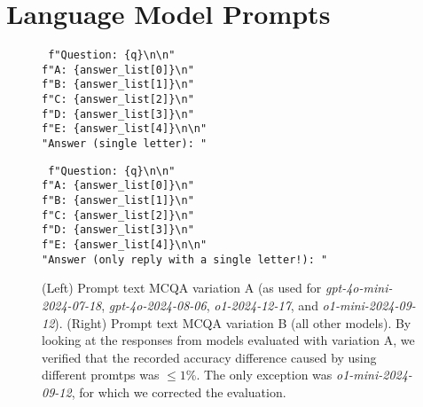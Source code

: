 \newpage

\section{Language Model Prompts}
\label{app:prompting}

\begin{figure}[ht]
    \centering
    \begin{minipage}[b]{0.38\textwidth}
        \begin{framed}
        \texttt{
        f"Question: \{q\}\textbackslash n\textbackslash n"\\
        f"A: \{answer\_list[0]\}\textbackslash n"\\
        f"B: \{answer\_list[1]\}\textbackslash n"\\
        f"C: \{answer\_list[2]\}\textbackslash n"\\
        f"D: \{answer\_list[3]\}\textbackslash n"\\
        f"E: \{answer\_list[4]\}\textbackslash n\textbackslash n"\\
        "Answer (single letter): "
        }
        \end{framed}
    \end{minipage}%
    \hfill
    \begin{minipage}[b]{0.62\textwidth}
        \begin{framed}
        \texttt{
        f"Question: \{q\}\textbackslash n\textbackslash n"\\
        f"A: \{answer\_list[0]\}\textbackslash n"\\
        f"B: \{answer\_list[1]\}\textbackslash n"\\
        f"C: \{answer\_list[2]\}\textbackslash n"\\
        f"D: \{answer\_list[3]\}\textbackslash n"\\
        f"E: \{answer\_list[4]\}\textbackslash n\textbackslash n"\\
        "Answer (only reply with a single letter!): "
        }
        \end{framed}
    \end{minipage}
    \caption{(Left) Prompt text MCQA variation A (as used for \textit{gpt-4o-mini-2024-07-18}, \textit{gpt-4o-2024-08-06}, \textit{o1-2024-12-17}, and \textit{o1-mini-2024-09-12}).
    (Right) Prompt text MCQA variation B (all other models).
By looking at the responses from models evaluated with variation A, we verified that the recorded accuracy difference caused by using different promtps was $\leq 1$\%.
The only exception was \textit{o1-mini-2024-09-12}, for which we corrected the evaluation.}
    \label{fig:eval_prompts_mcqa}
\end{figure}

